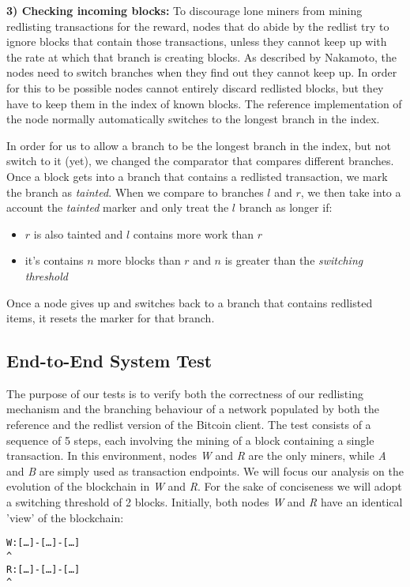 \documentclass[12pt,journal,compsoc]{IEEEtran}
\begin{document}
  \textbf{3) Checking incoming blocks:}
    To discourage lone miners from mining redlisting transactions for the reward, nodes that do
    abide by the redlist try to ignore blocks that contain those transactions, unless they cannot
    keep up with the rate at which that branch is creating blocks.
    As described by Nakamoto\cite{nakamoto2008bitcoin}, the nodes need to switch branches when they find out they
    cannot keep up.
    In order for this to be possible nodes cannot entirely discard redlisted blocks, but they have
    to keep them in the index of known blocks.
    The reference implementation of the node normally automatically switches to the longest branch
    in the index.

    In order for us to allow a branch to be the longest branch in the index, but not switch to it
    (yet), we changed the comparator that compares different branches.
    Once a block gets into a branch that contains a redlisted transaction, we mark the branch as
    \emph{tainted}.
    When we compare to branches $l$ and $r$, we then take into a account the \emph{tainted} marker
    and only treat the $l$ branch as longer if:

    \begin{itemize}
      \item $r$ is also tainted and $l$ contains more work than $r$
      \item it's contains $n$ more blocks than $r$ and $n$ is greater than the \emph{switching
        threshold}
    \end{itemize}

    Once a node gives up and switches back to a branch that contains redlisted items, it resets the
    marker for that branch.

\subsection{End-to-End System Test}
The purpose of our tests is to verify both the correctness of our redlisting mechanism and the branching behaviour of a network populated by both the reference and the redlist version of the Bitcoin client. The test consists of a sequence of 5 steps, each involving the mining of a block containing a single transaction. In this environment, nodes \emph{W} and \emph{R} are the only miners, while \emph{A} and \emph{B} are simply used as transaction endpoints. We will focus our analysis on the evolution of the blockchain in \emph{W} and \emph{R}. For the sake of  conciseness we will adopt a switching threshold of 2 blocks.
Initially, both nodes \emph{W} and \emph{R} have an identical 'view' of the blockchain:
\newline
 \begin{alltt}
W:   [\ldots]\--[\ldots]\--[\ldots]
      		            ^
R:   [\ldots]\--[\ldots]\--[\ldots]
      		            ^
\end{alltt}
\end{document}
